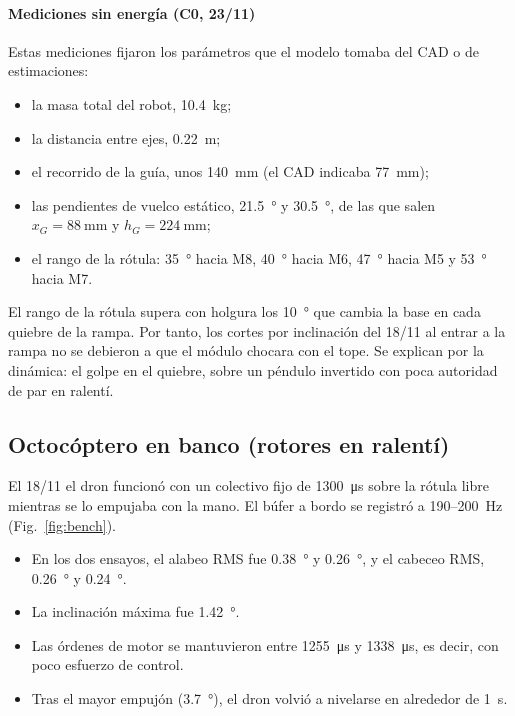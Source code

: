 \paragraph{Mediciones sin energía (C0, 23/11)} Estas mediciones fijaron los parámetros que el modelo tomaba del CAD o de estimaciones:
\begin{itemize}
  \item la masa total del robot, \SI{10.4}{\kilo\gram};
  \item la distancia entre ejes, \SI{0.22}{\metre};
  \item el recorrido de la guía, unos \SI{140}{\milli\metre} (el CAD indicaba \SI{77}{\milli\metre});
  \item las pendientes de vuelco estático, \SI{21.5}{\degree} y \SI{30.5}{\degree}, de las que salen $x_G=\SI{88}{\milli\metre}$ y $h_G=\SI{224}{\milli\metre}$;
  \item el rango de la rótula: \SI{35}{\degree} hacia M8, \SI{40}{\degree} hacia M6, \SI{47}{\degree} hacia M5 y \SI{53}{\degree} hacia M7.
\end{itemize}
El rango de la rótula supera con holgura los \SI{10}{\degree} que cambia la base en cada quiebre de la rampa. Por tanto, los cortes por inclinación del 18/11 al entrar a la rampa no se debieron a que el módulo chocara con el tope. Se explican por la dinámica: el golpe en el quiebre, sobre un péndulo invertido con poca autoridad de par en ralentí.

\subsection{Octocóptero en banco (rotores en ralentí)}
El 18/11 el dron funcionó con un colectivo fijo de \SI{1300}{\micro\second} sobre la rótula libre mientras se lo empujaba con la mano. El búfer a bordo se registró a 190--\SI{200}{\hertz} (Fig.~\ref{fig:bench}).

\begin{itemize}
  \item En los dos ensayos, el alabeo RMS fue \SI{0.38}{\degree} y \SI{0.26}{\degree}, y el cabeceo RMS, \SI{0.26}{\degree} y \SI{0.24}{\degree}.
  \item La inclinación máxima fue \SI{1.42}{\degree}.
  \item Las órdenes de motor se mantuvieron entre \SI{1255}{\micro\second} y \SI{1338}{\micro\second}, es decir, con poco esfuerzo de control.
  \item Tras el mayor empujón (\SI{3.7}{\degree}), el dron volvió a nivelarse en alrededor de \SI{1}{\second}.
\end{itemize}

